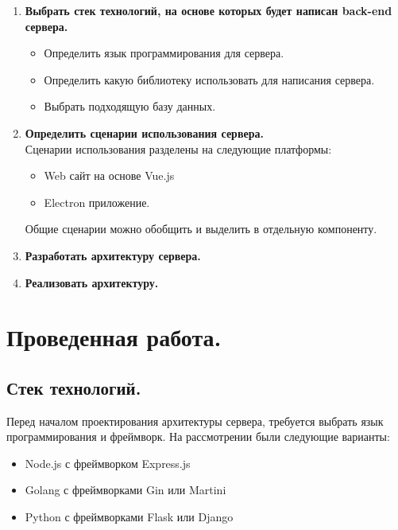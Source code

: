 \documentclass[12pt, russian]{extarticle}
\begin{document}
\begin{spacing}{1.5}
    \begin{enumerate}
        \item \textbf{Выбрать стек технологий, на основе которых будет написан back-end сервера.}
            \begin{itemize}
                \item Определить язык программирования для сервера.
                \item Определить какую библиотеку использовать для написания сервера.
                \item Выбрать подходящую базу данных.
            \end{itemize}
        \item \textbf{Определить сценарии использования сервера.} \\
            Сценарии использования разделены на следующие платформы:
            \begin{itemize}
                \item Web сайт на основе Vue.js
                \item Electron приложение.
            \end{itemize}
            Общие сценарии можно обобщить и выделить в отдельную компоненту.
        \item \textbf{Разработать архитектуру сервера.}
        \item \textbf{Реализовать архитектуру.}
    \end{enumerate}

    \newpage
    \section{Проведенная работа.}
    \subsection{Стек технологий.}

    Перед началом проектирования архитектуры сервера, требуется выбрать язык программирования
    и фреймворк. На рассмотрении были следующие варианты:

    \begin{itemize}
        \item Node.js с фреймворком Express.js
        \item Golang с фреймворками Gin или Martini
        \item Python с фреймворками Flask или Django
    \end{itemize}


\end{spacing}
\end{document}
